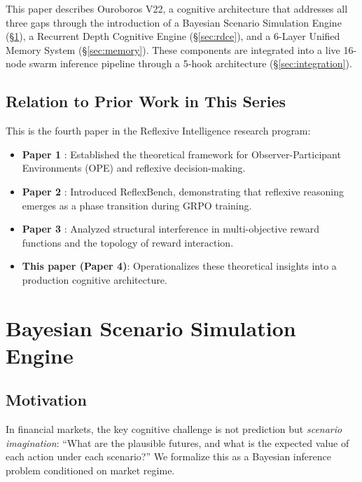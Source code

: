 \documentclass[11pt, a4paper]{article}
\begin{document}
This paper describes Ouroboros V22, a cognitive architecture that addresses all three gaps through the introduction of a Bayesian Scenario Simulation Engine (\S\ref{sec:bayesian}), a Recurrent Depth Cognitive Engine (\S\ref{sec:rdce}), and a 6-Layer Unified Memory System (\S\ref{sec:memory}). These components are integrated into a live 16-node swarm inference pipeline through a 5-hook architecture (\S\ref{sec:integration}).

\subsection{Relation to Prior Work in This Series}

This is the fourth paper in the Reflexive Intelligence research program:
\begin{itemize}[leftmargin=*]
  \item \textbf{Paper 1} \cite{paper1}: Established the theoretical framework for Observer-Participant Environments (OPE) and reflexive decision-making.
  \item \textbf{Paper 2} \cite{paper2}: Introduced ReflexBench, demonstrating that reflexive reasoning emerges as a phase transition during GRPO training.
  \item \textbf{Paper 3} \cite{paper3}: Analyzed structural interference in multi-objective reward functions and the topology of reward interaction.
  \item \textbf{This paper (Paper 4)}: Operationalizes these theoretical insights into a production cognitive architecture.
\end{itemize}


\section{Bayesian Scenario Simulation Engine}
\label{sec:bayesian}

\subsection{Motivation}

In financial markets, the key cognitive challenge is not prediction but \emph{scenario imagination}: ``What are the plausible futures, and what is the expected value of each action under each scenario?'' We formalize this as a Bayesian inference problem conditioned on market regime.
\end{document}
